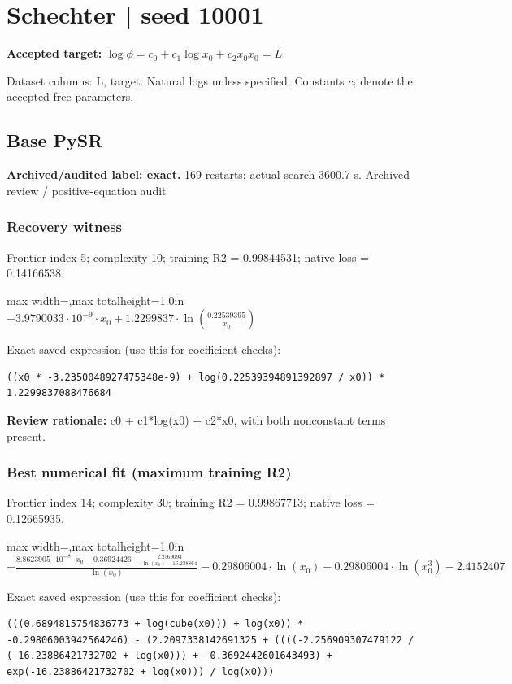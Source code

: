 \documentclass[10pt,letterpaper,landscape]{article}
\begin{document}
\section*{Schechter | seed 10001}
\textbf{Accepted target:} $\displaystyle \log\phi=c_0+c_1\log x_0+c_2x_0$\hfill $x_0=L$\par
{\small Dataset columns: L, target. Natural logs unless specified. Constants $c_i$ denote the accepted free parameters.}\par\medskip
\begin{minipage}[t]{0.485\textwidth}
\subsection*{Base PySR}
\textbf{Archived/audited label: exact.} 169 restarts; actual search 3600.7 s.
{\small Archived review / positive-equation audit}
\subsubsection*{Recovery witness}
Frontier index 5; complexity 10; training R2 = 0.99844531; native loss = 0.14166538.
\begin{center}\begin{adjustbox}{max width=\linewidth,max totalheight=1.0in}$\displaystyle - 3.9790033 \cdot 10^{-9} \cdot x_{0} + 1.2299837 \cdot \ln{\left(\frac{0.22539395}{x_{0}} \right)}$\end{adjustbox}\end{center}
{\scriptsize Exact saved expression (use this for coefficient checks):}
\begin{lstlisting}
((x0 * -3.2350048927475348e-9) + log(0.22539394891392897 / x0)) * 1.2299837088476684
\end{lstlisting}
{\small\textbf{Review rationale:} c0 + c1*log(x0) + c2*x0, with both nonconstant terms present.}
\subsubsection*{Best numerical fit (maximum training R2)}
Frontier index 14; complexity 30; training R2 = 0.99867713; native loss = 0.12665935.
\begin{center}\begin{adjustbox}{max width=\linewidth,max totalheight=1.0in}$\displaystyle - \frac{8.8623905 \cdot 10^{-8} \cdot x_{0} - 0.36924426 - \frac{2.2569093}{\ln{\left(x_{0} \right)} - 16.238864}}{\ln{\left(x_{0} \right)}} - 0.29806004 \cdot \ln{\left(x_{0} \right)} - 0.29806004 \cdot \ln{\left(x_{0}^{3} \right)} - 2.4152407$\end{adjustbox}\end{center}
{\scriptsize Exact saved expression (use this for coefficient checks):}
\begin{lstlisting}
(((0.6894815754836773 + log(cube(x0))) + log(x0)) * -0.29806003942564246) - (2.2097338142691325 + ((((-2.256909307479122 / (-16.23886421732702 + log(x0))) + -0.3692442601643493) + exp(-16.23886421732702 + log(x0))) / log(x0)))
\end{lstlisting}
\end{minipage}\hfill
\end{document}
